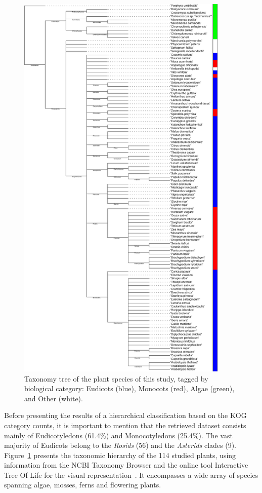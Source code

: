 \begin{figure}[htp]
\centering
\includegraphics[width=0.9\textwidth]{figures/Taxa}
\caption{Taxonomy tree of the plant species of this study, 
tagged by biological category: Eudicots (blue), Monocots 
(red), Algae (green), and Other (white).
}
\label{fig:taxa}
\end{figure}

Before presenting the results of a hierarchical 
classification based on the KOG category counts, it is 
important to mention that the retrieved dataset consists 
mainly of Eudicotyledons (61.4\%) and Monocotyledons (25.4\%). 
The vast majority of Eudicots belong to the \emph{Rosids} (56) 
and the \emph{Asterids} clades (9). Figure~\ref{fig:taxa} 
presents the taxonomic hierarchy of 
the 114 studied plants, using information from the NCBI Taxonomy 
Browser and the online tool Interactive Tree Of Life for 
the visual representation~\citep{letunic2021}. It 
encompasses a wide array of species spanning algae, 
mosses, ferns and flowering plants.

